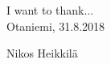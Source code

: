 I want to thank...\\ %

\vspace{5cm}
Otaniemi, 31.8.2018

\vspace{5mm}
{\hfill Nikos Heikkilä \hspace{1cm}}
